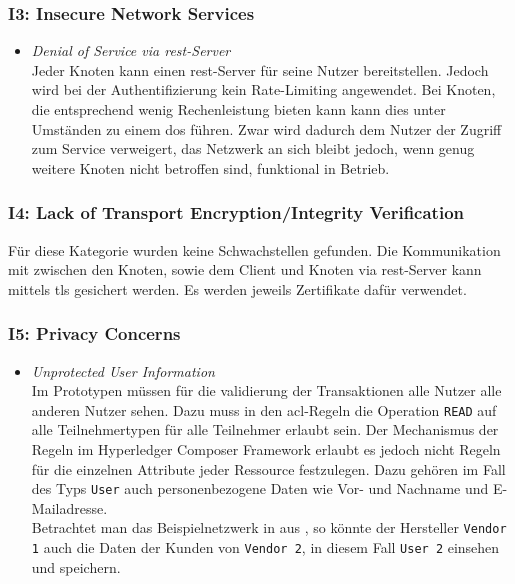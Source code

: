         \subsubsection*{I3: Insecure Network Services}
            \begin{itemize}[leftmargin=0cm,label={}]
                \item \emph{Denial of Service via \gls{rest}-Server}\label{vuln:prototype_dos}\\
        	        Jeder Knoten kann einen \gls{rest}-Server für seine Nutzer bereitstellen. 
        	        Jedoch wird bei der Authentifizierung kein Rate-Limiting angewendet. 
        	        Bei Knoten, die entsprechend wenig Rechenleistung bieten kann kann dies unter Umständen zu einem \gls{dos} führen. 
        	        Zwar wird dadurch dem Nutzer der Zugriff zum Service verweigert, das Netzwerk an sich bleibt jedoch, wenn genug weitere Knoten nicht betroffen sind, funktional in Betrieb.
            \end{itemize}
            
        \subsubsection*{I4: Lack of Transport Encryption/Integrity Verification}
            Für diese Kategorie wurden keine Schwachstellen gefunden. 
            Die Kommunikation mit zwischen den Knoten, sowie dem Client und Knoten via \gls{rest}-Server kann mittels \gls{tls} gesichert werden. 
            Es werden jeweils Zertifikate dafür verwendet.
            
        \subsubsection*{I5: Privacy Concerns}
            \begin{itemize}[leftmargin=0cm,label={}]
                \item \emph{Unprotected User Information}\label{vuln:prototype_userdata}\\
                    Im Prototypen müssen für die validierung der Transaktionen alle Nutzer alle anderen Nutzer sehen. 
                    Dazu muss in den \gls{acl}-Regeln die Operation \colorbox{light-gray}{\lstinline{READ}} auf alle Teilnehmertypen für alle Teilnehmer erlaubt sein. 
                    Der Mechanismus der Regeln im Hyperledger Composer Framework erlaubt es jedoch nicht Regeln für die einzelnen Attribute jeder Ressource festzulegen. 
                    Dazu gehören im Fall des Typs \colorbox{light-gray}{\lstinline{User}} auch personenbezogene Daten wie Vor- und Nachname und E-Mailadresse.\\
                    Betrachtet man das Beispielnetzwerk in  aus , so könnte der Hersteller \colorbox{light-gray}{\lstinline{Vendor 1}} auch die Daten der Kunden von \colorbox{light-gray}{\lstinline{Vendor 2}}, in diesem Fall \colorbox{light-gray}{\lstinline{User 2}} einsehen und speichern.
            \end{itemize}
            
